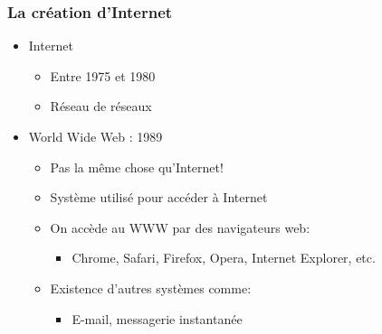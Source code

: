 \documentclass{beamer}
\begin{document}
      \begin{frame}
        \frametitle{La création d'Internet}
        \begin{itemize}
          \item<2-> Internet
            \begin{itemize}
              \item Entre 1975 et 1980
              \item Réseau de réseaux
            \end{itemize}
          \item<3-> World Wide Web : 1989
            \begin{itemize}
              \item Pas la même chose qu'Internet!
              \item Système utilisé pour accéder à Internet
              \item On accède au WWW par des navigateurs web:
                \begin{itemize}
                  \item Chrome, Safari, Firefox, Opera, Internet Explorer, etc.
                \end{itemize}
              \item Existence d'autres systèmes comme:
                \begin{itemize}
                  \item E-mail, messagerie instantanée 
                \end{itemize}
            \end{itemize}
        \end{itemize}
      \end{frame}
      
\end{document}
